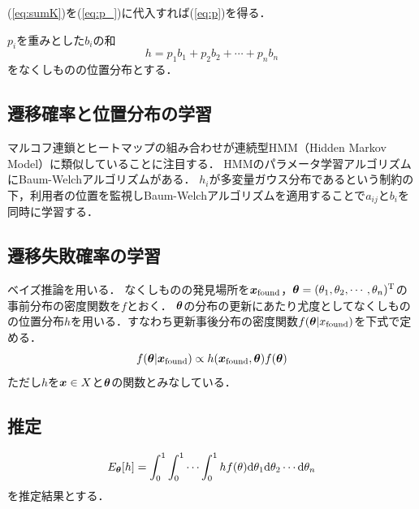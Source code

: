 (\ref{eq:sumK})を(\ref{eq:p_})に代入すれば(\ref{eq:p})を得る．

$ p_i $を重みとした$ b_i $の和
\begin{equation} \label{eq:h}
    h = p_1 b_1 + p_2 b_2 + \cdots + p_n b_n
\end{equation}
をなくしものの位置分布とする．

\subsection{遷移確率と位置分布の学習}
マルコフ連鎖とヒートマップの組み合わせが連続型HMM（Hidden Markov Model）に類似していることに注目する．
HMMのパラメータ学習アルゴリズムにBaum-Welchアルゴリズムがある．\cite{ishii_ueda}
$ h_i $が多変量ガウス分布であるという制約の下，利用者の位置を監視しBaum-Welchアルゴリズムを適用することで$ a_{i j} $と$ b_i $を同時に学習する．

\subsection{遷移失敗確率の学習} \label{ss:faultprob}
ベイズ推論を用いる．
なくしものの発見場所を$ \boldsymbol{x}_{\mathrm{found}} $，$ \boldsymbol{\theta} = (\theta_1 , \theta_2 , \cdots , \theta_n)^\mathrm{T} $の事前分布の密度関数を$ f $とおく．
$ \boldsymbol{\theta} $の分布の更新にあたり尤度としてなくしものの位置分布$ h $を用いる．すなわち更新事後分布の密度関数$ f(\boldsymbol{\theta} | x_{\mathrm{found}}) $を下式で定める．
\begin{equation} \label{eq:new_f}
    f(\boldsymbol{\theta} | \boldsymbol{x}_{\mathrm{found}}) \propto h(\boldsymbol{x}_{\mathrm{found}} , \boldsymbol{\theta}) f(\boldsymbol{\theta})
\end{equation}
ただし$ h $を$ \boldsymbol{x} \in X $と$ \boldsymbol{\theta} $の関数とみなしている．

\subsection{推定}
\begin{equation} \label{eq:exp}
    E_{\boldsymbol{\theta}} [h] = \int_{0}^{1} \int_{0}^{1} \cdots \int_{0}^{1} h f(\theta) \mathrm{d}\theta_1 \mathrm{d}\theta_2 \cdots \mathrm{d}\theta_n
\end{equation}
を推定結果とする．

